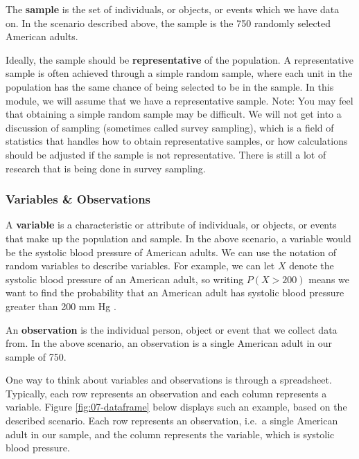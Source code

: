 \documentclass[
]{book}
\begin{document}
The \textbf{sample} is the set of individuals, or objects, or events which we have data on. In the scenario described above, the sample is the 750 randomly selected American adults.

Ideally, the sample should be \textbf{representative} of the population. A representative sample is often achieved through a simple random sample, where each unit in the population has the same chance of being selected to be in the sample. In this module, we will assume that we have a representative sample. Note: You may feel that obtaining a simple random sample may be difficult. We will not get into a discussion of sampling (sometimes called survey sampling), which is a field of statistics that handles how to obtain representative samples, or how calculations should be adjusted if the sample is not representative. There is still a lot of research that is being done in survey sampling.

\subsubsection{Variables \& Observations}\label{variables-observations}

A \textbf{variable} is a characteristic or attribute of individuals, or objects, or events that make up the population and sample. In the above scenario, a variable would be the systolic blood pressure of American adults. We can use the notation of random variables to describe variables. For example, we can let \(X\) denote the systolic blood pressure of an American adult, so writing \(P(X>200)\) means we want to find the probability that an American adult has systolic blood pressure greater than 200 mm Hg .

An \textbf{observation} is the individual person, object or event that we collect data from. In the above scenario, an observation is a single American adult in our sample of 750.

One way to think about variables and observations is through a spreadsheet. Typically, each row represents an observation and each column represents a variable. Figure \ref{fig:07-dataframe} below displays such an example, based on the described scenario. Each row represents an observation, i.e.~a single American adult in our sample, and the column represents the variable, which is systolic blood pressure.
\end{document}
